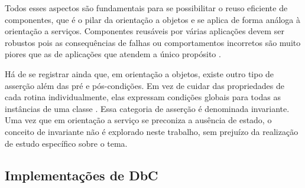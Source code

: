 Todos esses aspectos são fundamentais para se possibilitar o reuso eficiente de
componentes, que é o pilar da orientação a objetos e se aplica de forma análoga
à orientação a serviços. Componentes reusáveis por várias aplicações devem ser
robustos pois as consequências de falhas ou comportamentos incorretos são muito
piores que as de aplicações que atendem a único propósito
\cite{meyer1992applying}.

Há de se registrar ainda que, em orientação a objetos, existe outro tipo de
asserção além das pré e pós-condições. Em vez de cuidar das propriedades de cada
rotina individualmente, elas expressam condições globais para todas as
instâncias de uma classe \cite{meyer1997object}. Essa categoria de
asserção é denominada invariante. Uma vez que em orientação a serviço se
preconiza a ausência de estado, o conceito de invariante não é explorado neste
trabalho, sem prejuízo da realização de estudo específico sobre o tema.



\subsection{Implementações de DbC}
\label{implementDbC}

